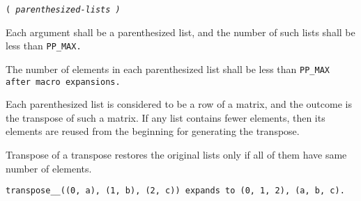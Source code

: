 
 \tt{(} \it{parenthesized-lists} \tt{)}


Each argument shall be a parenthesized list,
and the number of such lists shall be less than \tt{PP_MAX}.

The number of elements in each parenthesized list
shall be less than \tt{PP_MAX} after macro expansions.


Each parenthesized list is considered to be a row of a matrix,
and the outcome is the transpose of such a matrix.
If any list contains fewer elements, then its elements are
reused from the beginning for generating the transpose.

\note Transpose of a transpose restores the original
lists only if all of them have same number of elements.

\example \tt{transpose__((0, a), (1, b), (2, c))}
expands to \tt{(0, 1, 2), (a, b, c)}.

